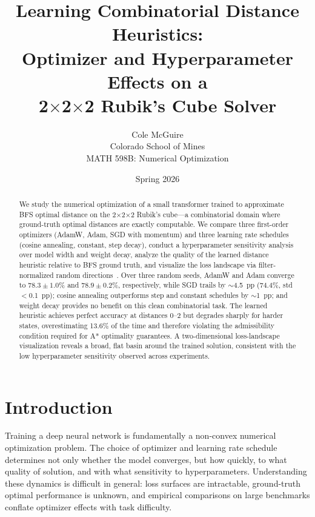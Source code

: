 \documentclass[11pt]{article}
\title{\textbf{Learning Combinatorial Distance Heuristics:}\\[4pt]
Optimizer and Hyperparameter Effects on a\\
2$\times$2$\times$2 Rubik's Cube Solver}
\author{Cole McGuire\\[2pt]
\small Colorado School of Mines\\
\small MATH 598B: Numerical Optimization}
\date{Spring 2026}
\begin{document}
\maketitle

\begin{abstract}
We study the numerical optimization of a small transformer trained to approximate
BFS optimal distance on the 2$\times$2$\times$2 Rubik's cube---a combinatorial
domain where ground-truth optimal distances are exactly computable.
We compare three first-order optimizers (AdamW, Adam, SGD with momentum) and
three learning rate schedules (cosine annealing, constant, step decay), conduct
a hyperparameter sensitivity analysis over model width and weight decay, analyze
the quality of the learned distance heuristic relative to BFS ground truth, and
visualize the loss landscape via filter-normalized random directions~\cite{li2018landscape}.
Over three random seeds, AdamW and Adam converge to $78.3\!\pm\!1.0$\% and
$78.9\!\pm\!0.2$\%, respectively, while SGD trails by $\sim$4.5~pp ($74.4$\%, std $<$0.1~pp);
cosine annealing outperforms step and constant schedules by $\sim$1~pp; and
weight decay provides no benefit on this clean combinatorial task.
The learned heuristic achieves perfect accuracy at distances 0--2 but degrades
sharply for harder states, overestimating 13.6\% of the time and therefore
violating the admissibility condition required for A* optimality guarantees.
A two-dimensional loss-landscape visualization reveals a broad, flat basin around
the trained solution, consistent with the low hyperparameter sensitivity observed
across experiments.
\end{abstract}

\section{Introduction}
\label{sec:intro}

Training a deep neural network is fundamentally a non-convex numerical
optimization problem. The choice of optimizer and learning rate schedule
determines not only whether the model converges, but how quickly, to what
quality of solution, and with what sensitivity to hyperparameters.
Understanding these dynamics is difficult in general: loss surfaces are
intractable, ground-truth optimal performance is unknown, and empirical
comparisons on large benchmarks conflate optimizer effects with task difficulty.
\end{document}

